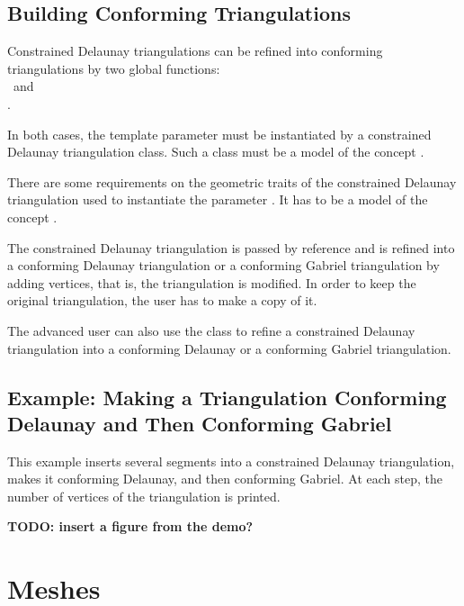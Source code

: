\subsection{Building Conforming Triangulations}
\label{sec:Mesh_2_building_conforming}

Constrained Delaunay triangulations can be refined into
conforming triangulations 
by two global functions: \\
~and\\
. 

In both cases, the template parameter  must be instantiated
by a constrained Delaunay triangulation class.  Such a class must be a
model of the concept .

There are some requirements on the geometric traits of the constrained
Delaunay triangulation used to instantiate the parameter .
It has to be a model of the concept
.

The constrained Delaunay triangulation  is passed by reference
and is refined into a conforming Delaunay triangulation or a
conforming Gabriel triangulation by adding vertices, that is, the
triangulation is modified. In order to keep the original
triangulation, the user has to make a copy of it.

The advanced user can also use the class
 to refine a
constrained Delaunay triangulation into a conforming Delaunay or a
conforming Gabriel triangulation.

\subsection{Example: Making a Triangulation Conforming Delaunay and Then
  Conforming Gabriel}
\label{sec:Mesh_2_example_making_conforming}

This example inserts several segments into a constrained Delaunay
triangulation, makes it conforming Delaunay, and then conforming
Gabriel. At each step, the number of vertices of the triangulation is
printed.


\textbf{TODO: insert a figure from the demo?}

\section{Meshes}
\label{sec:Mesh_2_meshes}


